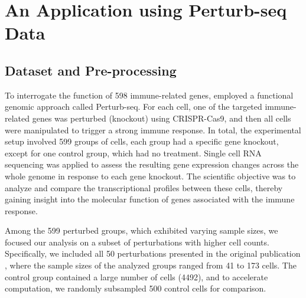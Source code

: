 \documentclass[11pt]{article}
\begin{document}

\section{An Application using Perturb-seq Data}\label{section: clearys data}

\subsection{Dataset and Pre-processing}

To interrogate the function of 598 immune-related genes,  \citet{yao2024scalable} employed a functional genomic approach called Perturb-seq. 
For each cell, one of the targeted immune-related genes was perturbed (knockout) using CRISPR-Cas9, and then all cells were manipulated to trigger a strong immune response. In total, the experimental setup involved 599 groups of cells, each group had a specific gene knockout, except for one control group, which had no treatment. Single cell RNA sequencing was applied to assess the resulting gene expression changes across the whole genome in response to each gene knockout. The scientific objective was to analyze and compare the transcriptional profiles between these cells, thereby gaining insight into the molecular function of genes associated with the immune response.  

Among the 599 perturbed groups, which exhibited varying sample sizes, we focused our analysis on a subset of perturbations with higher cell counts. Specifically, we included all 50 perturbations presented in the original publication \cite[Figure 3D, left]{yao2024scalable}, where the sample sizes of the analyzed groups ranged from 41 to 173 cells. The control group contained a large number of cells (4492), and to accelerate computation, we randomly subsampled 500 control cells for comparison. 
\end{document}
